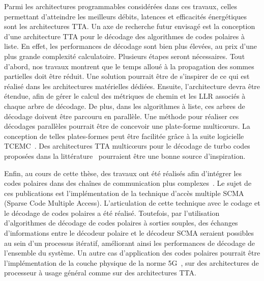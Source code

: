 Parmi les architectures programmables considérées dans ces travaux, celles permettant d'atteindre les meilleurs débits, latences et efficacités énergétiques sont les architectures TTA.
Un axe de recherche futur envisagé est la conception d'une architecture TTA pour le décodage des algorithmes de codes polaires à liste.
En effet, les performances de décodage sont bien plus élevées, au prix d'une plus grande complexité calculatoire.
Plusieurs étapes seront nécessaires. Tout d'abord, nos travaux montrent que le temps alloué à la propagation des sommes partielles doit être réduit.
Une solution pourrait être de s'inspirer de ce qui est réalisé dans les architectures matérielles dédiées.
Ensuite, l'architecture devra être étendue, afin de gérer le calcul des métriques de chemin et les LLR associés à chaque arbre de décodage. De plus, dans les algorithmes à liste, ces arbres de décodage doivent être parcouru en parallèle. Une méthode pour réaliser ces décodages parallèles pourrait être de concevoir une plate-forme multicœurs. La conception de telles plates-formes peut être facilitée grâce à la suite logicielle TCEMC~\cite{tcemc_2011}. Des architectures TTA multicœurs pour le décodage de turbo codes proposées dans la littérature~\cite{kultala_turbo_2013} pourraient être une bonne source d'inspiration.

Enfin, au cours de cette thèse, des travaux ont été réalisés afin d'intégrer les codes polaires dans des chaînes de communication plus complexes~. Le sujet de ces publications est l'implémentation de la technique d'accès multiple SCMA (Sparse Code Multiple Access). L'articulation de cette technique avec le codage et le décodage de codes polaires a été réalisé. Toutefois, par l'utilisation d'algorithmes de décodage de codes polaires à sorties souples, des échanges d'informations entre le décodeur polaire et le décodeur SCMA seraient possibles au sein d'un processus itératif, améliorant ainsi les performances de décodage de l'ensemble du système. Un autre cas d'application des codes polaires pourrait être l'implémentation de la couche physique de la norme 5G~\cite{3gpp_ts_2017}, sur des architectures de processeur à usage général comme sur des architectures TTA.
